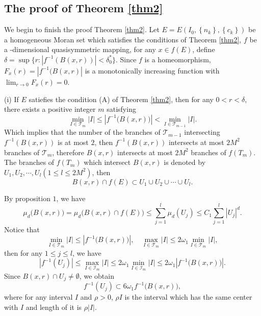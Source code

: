 \documentclass[reqno]{amsart}
\theoremstyle{plain}
\theoremstyle{definition}
\theoremstyle{remark}
\numberwithin{equation}{section} \DeclareMathOperator\intr{int}
\begin{document}
\subsection{The proof of Theorem \ref{thm2} }
We begin to finish the proof Theorem \ref{thm2}. Let $E=E(I_{0},\left\{n_{k}\right\},\left\{c_{k}\right\})$ be a homogeneous Moran set which satisfies the conditions of Theorem \ref{thm2}, $f$ be a -dimensional quasisymmetric mapping, for any $x\in f(E)$, define $\delta=\sup\{r:|f^{-1}(B(x,r))|<\delta^{*}_{0}\}$.
Since $f$ is a homeomorphism, $F_{x}(r)=|f^{-1}(B(x,r)|$ is a monotonically increasing function with $\lim_{r\to 0}F_{x}(r)=0$.

(i) If $E$ satiefies the condition {\rm(A)} of Theorem {\rm\ref{thm2}}, then for any $0<r<\delta$, there exists a   positive integer $m$ satisfying
$$\min_{I\in \mathcal{T}_m }\left | I \right |\le \left | f^{-1}\big(B(x,r)\big) \right |< \min_{I\in \mathcal{T}_{m-1} }\left | I \right |. $$
Which implies that  the number of the branches of $\mathcal{T}_{m-1}$ intersecting  $f^{-1}(B(x,r))$ is at most $2$, then $f^{-1}(B(x,r))$ intersects at most $2M^2$ branches of $\mathcal{T}_{m}$, therefore
$B(x,r)$ intersects at most $2M^2$ branches of $f(T_{m})$. The branches of $f(T_{m})$ which intersect $B(x,r)$ is denoted by $U_1,U_2, \cdots, U_l(1\le l\le2M^2)$, then
$${B(x,r) }\cap f(E)\subset U_1\cup U_2 \cup \cdots \cup U_l.$$

By proposition $1$, we have
\begin{equation}\label{627}
\mu_d\big(B(x,r)\big)=\mu_d\big(B(x,r)\cap f(E)\big)\le \sum_{j=1}^{l}\mu_d(U_j)\le C_1\sum_{j=1}^{l}\left | U_j \right |^d.
\end{equation}
Notice that
$$\min_{I\in \mathcal{T}_m }\left | I \right |\le \left | f^{-1}\big(B(x,r)\big) \right |,\quad \max_{I\in \mathcal{T}_m }\left | I \right |\le2\omega_1 \min_{I\in \mathcal{T}_m }\left | I \right |,$$
then for any $1\le j \le l$, we have
$$\left | f^{-1}(U_j) \right | \le \max_{I\in \mathcal{I}_m }\left |I \right | \le 2\omega_1 \min_{I\in \mathcal{I}_m }\left | I \right |\le 2\omega_1 \left | f^{-1}\big(B(x,r)\big) \right |.$$
Since $B(x,r)\cap U_j\ne \emptyset$, we obtain
$$f^{-1}(U_j)\subset 6\omega_1 f^{-1}\big(B(x,r)\big),$$
where for any interval $I$ and $\rho>0$, $\rho I$ is the interval which has the same center with $I$ and length of it is $\rho \left|I\right|$.
\end{document}
